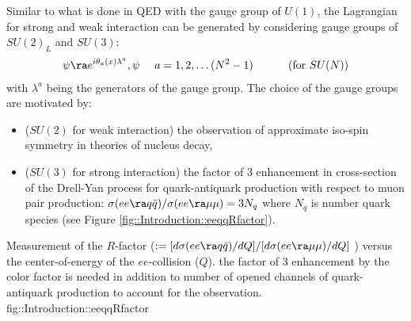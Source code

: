 Similar to what is done in QED with the gauge group of $U(1)$, the Lagrangian for strong and weak interaction can be generated by considering gauge groups of $SU(2)_L$ and $SU(3)$:
\begin{align}
\psi \ra e^{i \theta_a(x) \lambda^a}, \psi \,\,\,\,\,\,\,\, a=1,2,\dots (N^2-1) \,\,\,\,\,\, \mbox{\phantom{MM}  (for $SU(N)$)}  \nn 
\end{align}
with $\lambda^a$ being the generators of the gauge group. 
The choice of the gauge groups are motivated by:
\begin{itemize}
\item ($SU(2)$ for weak interaction) the observation of approximate iso-spin symmetry in theories of nucleus decay, 
\item ($SU(3)$ for strong interaction) the factor of 3 enhancement in cross-section of the Drell-Yan process for quark-antiquark production with respect to muon pair production: $\sigma(ee\ra q\bar{q})/\sigma(ee\ra\mu\mu) = 3N_q$ where $N_q$ is number quark species (see Figure \ref{fig::Introduction::eeqqRfactor}). 
\end{itemize}


{Measurement of the $R$-factor ($:= [d\sigma(ee\ra q\bar{q})/dQ]/[d\sigma(ee\ra\mu\mu)/dQ]$ ) versus the center-of-energy of the $ee$-collision ($Q$). 
the factor of 3 enhancement by the color factor is needed in addition to number of opened channels of quark-antiquark production to account for the observation.} 
{fig::Introduction::eeqqRfactor}



